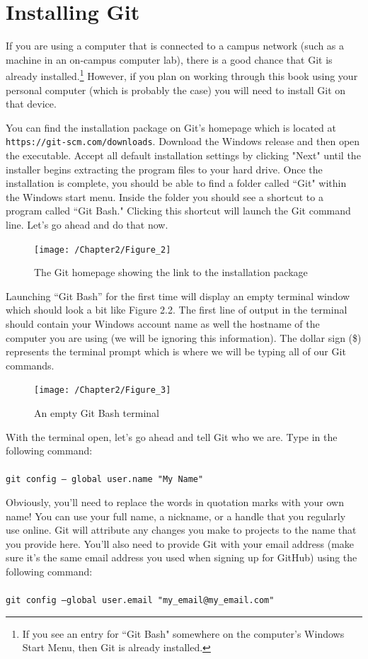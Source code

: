 \documentclass{book}
\begin{document}
\section{Installing Git}

If you are using a computer that is connected to a campus network (such as a machine in an on-campus computer lab), there is a good chance that Git is already installed.\footnote{If you see an entry for ``Git Bash" somewhere on the computer's Windows Start Menu, then Git is already installed.} However, if you plan on working through this book using your personal computer (which is probably the case) you will need to install Git on that device.

You can find the installation package on Git's homepage which is located at \texttt{https://git-scm.com/downloads}. Download the Windows release and then open the executable. Accept all default installation settings by clicking "Next" until the installer begins extracting the program files to your hard drive. Once the installation is complete, you should be able to find a folder called ``Git" within the Windows start menu. Inside the folder you should see a shortcut to a program called ``Git Bash." Clicking this shortcut will launch the Git command line. Let's go ahead and do that now.

\begin{figure}[h]
	\caption{The Git homepage showing the link to the installation package}
	\centering\texttt{[image: /Chapter2/Figure\_2]}
\end{figure}

Launching ``Git Bash'' for the first time will display an empty terminal window which should look a bit like Figure 2.2. The first line of output in the terminal should contain your Windows account name as well the hostname of the computer you are using (we will be ignoring this information). The dollar sign (\$) represents the terminal prompt which is where we will be typing all of our Git commands.

\begin{figure}[h]
	\caption{An empty Git Bash terminal}
	\centering\texttt{[image: /Chapter2/Figure\_3]}
\end{figure}

With the terminal open, let's go ahead and tell Git who we are. Type in the following command:\\ \\ \texttt{git config -- global user.name "My Name"}

Obviously, you'll need to replace the words in quotation marks with your own name! You can use your full name, a nickname, or a handle that you regularly use online. Git will attribute any changes you make to projects to the name that you provide here. You'll also need to provide Git with your email address (make sure it's the same email address you used when signing up for GitHub) using the following command: \\ \\ \texttt{git config --global user.email "my\_email@my\_email.com"}
\end{document}
